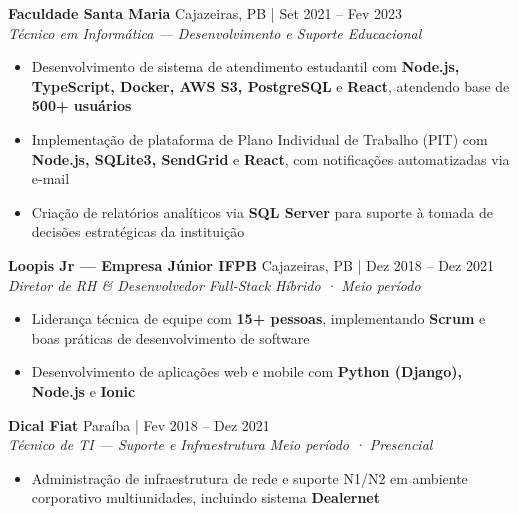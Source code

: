 \documentclass[a4paper]{article}
\begin{document}
\vspace{2mm}

\textbf{Faculdade Santa Maria} \hfill Cajazeiras, PB | Set 2021 -- Fev 2023\\
\textit{Técnico em Informática — Desenvolvimento e Suporte Educacional}\\
\vspace{-3mm}
\begin{itemize}[leftmargin=*, itemsep=-3pt]
    \item Desenvolvimento de sistema de atendimento estudantil com \textbf{Node.js, TypeScript, Docker, AWS S3, PostgreSQL} e \textbf{React}, atendendo base de \textbf{500+ usu\'{a}rios}
    \item Implementação de plataforma de Plano Individual de Trabalho (PIT) com \textbf{Node.js, SQLite3, SendGrid} e \textbf{React}, com notificações automatizadas via e-mail
    \item Criação de relatórios analíticos via \textbf{SQL Server} para suporte à tomada de decisões estratégicas da instituição
\end{itemize}

\vspace{2mm}

\textbf{Loopis Jr — Empresa J\'{u}nior IFPB} \hfill Cajazeiras, PB | Dez 2018 -- Dez 2021\\
\textit{Diretor de RH \& Desenvolvedor Full-Stack} \hfill \textit{H\'{i}brido · Meio per\'{i}odo}\\
\vspace{-3mm}
\begin{itemize}[leftmargin=*, itemsep=-3pt]
    \item Liderança técnica de equipe com \textbf{15+ pessoas}, implementando \textbf{Scrum} e boas práticas de desenvolvimento de software
    \item Desenvolvimento de aplicações web e mobile com \textbf{Python (Django), Node.js} e \textbf{Ionic}
\end{itemize}

\vspace{2mm}

\textbf{Dical Fiat} \hfill Para\'{i}ba | Fev 2018 -- Dez 2021\\
\textit{T\'{e}cnico de TI — Suporte e Infraestrutura} \hfill \textit{Meio per\'{i}odo · Presencial}\\
\vspace{-3mm}
\begin{itemize}[leftmargin=*, itemsep=-3pt]
    \item Administração de infraestrutura de rede e suporte N1/N2 em ambiente corporativo multiunidades, incluindo sistema \textbf{Dealernet}
\end{itemize}
\end{document}
